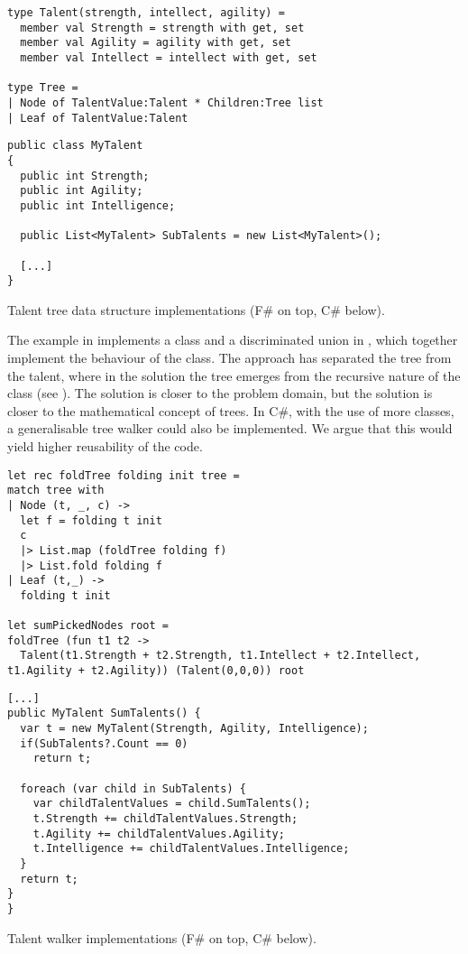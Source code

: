 \begin{listing}[H]
  \begin{verbatim}
type Talent(strength, intellect, agility) =
  member val Strength = strength with get, set
  member val Agility = agility with get, set
  member val Intellect = intellect with get, set

type Tree =
| Node of TalentValue:Talent * Children:Tree list
| Leaf of TalentValue:Talent
  \end{verbatim}
  \begin{verbatim}
public class MyTalent
{
  public int Strength;
  public int Agility;
  public int Intelligence;

  public List<MyTalent> SubTalents = new List<MyTalent>();

  [...]
}
  \end{verbatim}
  \caption{Talent tree data structure implementations (F\# on top, C\# below).}
  \label{lst:tree-data-imps}
\end{listing}

The example in  implements a class and a discriminated union in \fs, which together implement the behaviour of the \cs class. The \fs approach has separated the tree from the talent, where in the  \cs solution the tree emerges from the recursive nature of the class (see ). The \cs solution is closer to the problem domain, but the \fs solution is closer to the mathematical concept of trees. In C\#, with the use of more classes, a generalisable tree walker could also be implemented. We argue that this would yield higher reusability of the code.

\begin{listing}[H]
  \begin{verbatim}
let rec foldTree folding init tree =
match tree with
| Node (t, _, c) ->
  let f = folding t init
  c
  |> List.map (foldTree folding f)
  |> List.fold folding f
| Leaf (t,_) ->
  folding t init

let sumPickedNodes root =
foldTree (fun t1 t2 ->
  Talent(t1.Strength + t2.Strength, t1.Intellect + t2.Intellect, t1.Agility + t2.Agility)) (Talent(0,0,0)) root
\end{verbatim}
\begin{verbatim}
[...]
public MyTalent SumTalents() {
  var t = new MyTalent(Strength, Agility, Intelligence);
  if(SubTalents?.Count == 0)
    return t;

  foreach (var child in SubTalents) {
    var childTalentValues = child.SumTalents();
    t.Strength += childTalentValues.Strength;
    t.Agility += childTalentValues.Agility;
    t.Intelligence += childTalentValues.Intelligence;
  }
  return t;
}
}
\end{verbatim}
\caption{Talent walker implementations (F\# on top, C\# below).}
\label{lst:tree-walker-imps}
\end{listing}
